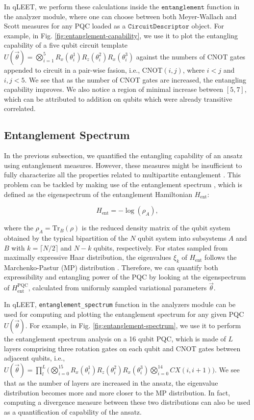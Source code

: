 In qLEET, we perform these calculations inside the $\texttt{entanglement}$ function in the analyzer module, where one can choose between both Meyer-Wallach and Scott measures for any PQC loaded as a $\texttt{CircuitDescriptor}$ object. For example, in Fig. \ref{fig:entanglement-capability}, we use it to plot the entangling capability of a five qubit circuit template $U(\vec{\theta}) = \bigotimes_{i=1}^{5}R_x(\theta_i^1)R_z(\theta_i^2)R_x(\theta_i^3)$ against the numbers of CNOT gates appended to circuit in a pair-wise fasion, i.e., CNOT$(i, j)$, where $i < j$ and $i,j <5$. We see that as the number of CNOT gates are increased, the entangling capability improves. We also notice a region of minimal increase between $[5, 7]$, which can be attributed to addition on qubits which were already transitive correlated.

\subsection{Entanglement Spectrum}

In the previous subsection, we quantified the entangling capability of an ansatz using entanglement measures. However, these measures might be insufficient to fully characterize all the properties related to multipartite entanglement \cite{PhysRevLett.115.267206}. This problem can be tackled by making use of the entanglement spectrum  \cite{PRXQuantum.1.020319}, which is defined as the eigenspectrum of the entanglement Hamiltonian $H_{\text{ent}}$:

\begin{equation}
    H_{\text{ent}} = -\log (\rho_A),
\end{equation}

where the $\rho_A = \text{Tr}_B(\rho)$ is the reduced density matrix of the qubit system obtained by the typical bipartition of the $N$ qubit system into subsystems $A$ and $B$ with $k = \lceil N/2 \rceil$ and $N-k$ qubits, respectively. For states sampled from maximally expressive Haar distribution, the eigenvalues $\xi_k$ of $H_{\text{ent}}$ follows the Marchenko-Pastur (MP) distribution \cite{10.1088/1751-8113/40/3/f04}. Therefore, we can quantify both expressibility and entangling power of the PQC by looking at the eigenspectrum of $H_{\text{ent}}^{\text{PQC}}$, calculated from uniformly sampled variational parameters $\vec{\theta}$. 

In qLEET, \texttt{entanglement\_spectrum} function in the analyzers module can be used for computing and plotting the entanglement spectrum for any given PQC $U(\vec{\theta})$. For example, in Fig. \ref{fig:entanglement-spectrum}, we use it to perform the entanglement spectrum analysis on a 16 qubit PQC, which is made of $L$ layers comprising three rotation gates on each qubit and CNOT gates between adjacent qubits, i.e., $U(\vec{\theta}) = \prod_{l}^{L}\big(\bigotimes_{i=0}^{15}R_x(\theta_i^1)R_z(\theta_i^2)R_x(\theta_i^3)\bigotimes_{i=0}^{14}CX(i, i+1)\big)$. We see that as the number of layers are increased in the ansatz, the eigenvalue distribution becomes more and more closer to the MP distribution. In fact, computing a divergence measure between these two distributions can also be used as a quantification of capability of the ansatz. 

